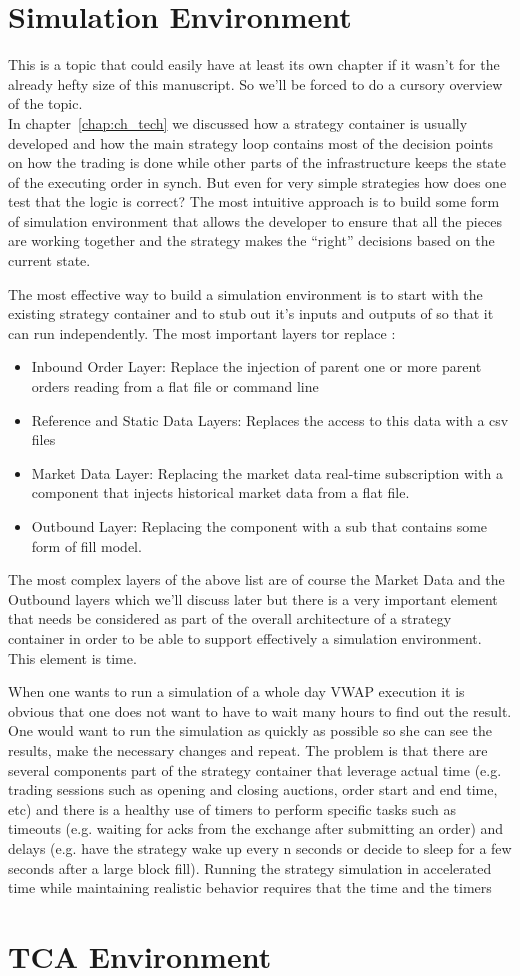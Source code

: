 \section{Simulation Environment}
This is a topic that could easily have at least its own chapter if it wasn't for the already hefty size of this manuscript. So we'll be forced to do a cursory overview of the topic. \\

In chapter~\ref{chap:ch_tech} we discussed how a strategy container is usually developed and how the main strategy loop contains most of the decision points on how the trading is done while other parts of the infrastructure keeps the state of the executing order in synch. But even for very simple strategies how does one test that the logic is correct? The most intuitive approach is to build some form of simulation environment that allows the developer to ensure that all the pieces are working together and the strategy makes the ``right'' decisions based on the current state. 

The most effective way to build a simulation environment is to start with the existing strategy container and to stub out  it's inputs and outputs of so that it can run independently.  The most important layers tor replace :
\begin{itemize}
\item Inbound Order Layer: Replace the injection of parent one or more parent orders reading from a flat file or command line
\item Reference and Static Data Layers: Replaces the access to this data with a csv files
\item Market Data Layer: Replacing the market data real-time subscription with a component that injects historical market data from a flat file.
\item Outbound Layer: Replacing the component with a sub that contains some form of fill model.
\end{itemize}

The most complex layers of the above list are of course the Market Data and the Outbound layers which we'll discuss later but there is a very important element that needs  be considered as part of the overall architecture of a strategy container in order to be able to support effectively a simulation environment. This element is time.

When one wants to run a simulation of a whole day VWAP execution it is obvious that one does not want to have to wait many hours to find out the result. One would want to run the simulation as quickly as possible so she can see the results, make the necessary changes and repeat. The problem is that there are several components part of the strategy container that leverage actual time (e.g. trading sessions such as opening and closing auctions, order start and end time, etc) and there is a healthy use of timers to perform specific tasks such as timeouts (e.g. waiting for acks from the exchange after submitting an order) and delays (e.g. have the strategy wake up every n seconds or decide to sleep for a few seconds after a large block fill). Running the strategy simulation in accelerated time while maintaining realistic behavior requires that the time and the timers 

\section{TCA Environment}

